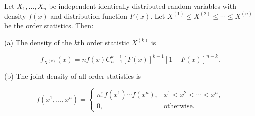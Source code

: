 Let $X_1, \ldots, X_n$ be independent identically distributed random variables with density $f(x)$ and distribution function $F(x)$. Let $X^{(1)} \leq X^{(2)} \leq \cdots \leq X^{(n)}$ be the order statistics. Then:

(a) The density of the $k$th order statistic $X^{(k)}$ is

$$f_{X^{(k)}}(x) = n f(x) C_{n-1}^{k-1} [F(x)]^{k-1} [1 - F(x)]^{n-k}.$$

(b) The joint density of all order statistics is

$$f(x^1, \ldots, x^n) = \begin{cases} n! \, f(x^1) \cdots f(x^n), & x^1 < x^2 < \cdots < x^n, \\ 0, & \text{otherwise}. \end{cases}$$
